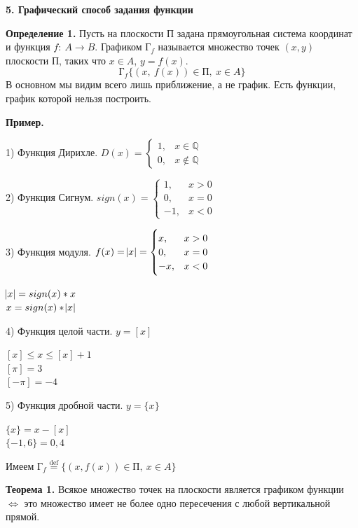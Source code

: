 \documentclass{article}
\begin{document}
    \textbf{5. Графический способ задания функции}
    
    \textbf{Определение 1.} Пусть на плоскости $\textrm{П}$ задана прямоугольная система координат и функция $f:\ A \rightarrow B$. Графиком $\textrm{Г}_f$ называется множество точек $(x, y)$ плоскости $\textrm{П}$, таких что $x \in A$, $y = f(x)$.
    \[\textrm{Г}_f \{ (x,\ f(x)) \in \textrm{П},\ x \in A\}\]
    В основном мы видим всего лишь приближение, а не график. Есть функции, график которой нельзя построить.

    \textbf{Пример.}

    1) Функция Дирихле. $D(x) = \begin{cases}
        1, & x \in \mathbb{Q}\\
        0, & x \not\in \mathbb{Q}
    \end{cases}$

    2) Функция Сигнум. $sign(x) = \begin{cases}
        1, & x > 0\\
        0, & x = 0\\
        -1, & x < 0
    \end{cases}$

    3) Функция модуля. $f(x) = \abs{x} = \begin{cases}
        x, & x > 0\\
        0, & x = 0\\
        -x, & x < 0
    \end{cases}$

    $\abs{x} = sign(x) * x$\\
    $x = sign(x) * \abs{x}$

    4) Функция целой части. $y = [x]$

    $[x] \leq x \leq [x] + 1$\\
    $[\pi] = 3$\\
    $[-\pi] = -4$

    5) Функция дробной части. $y = \{x\}$

    $\{x\} = x - [x]$\\
    $\{-1,6\} = 0,4$

    Имеем $\textrm{Г}_f \overset{\mathrm{def}}{=} \{(x, f(x)) \in \textrm{П},\ x \in A\}$

    \textbf{Теорема 1.} Всякое множество точек на плоскости является графиком функции $\Leftrightarrow$ это множество имеет не более одно пересечения с любой вертикальной прямой.
\end{document}
